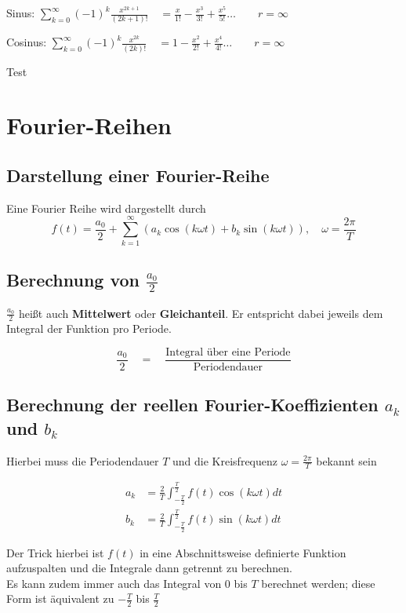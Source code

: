 \documentclass[12pt, a4paper]{scrreprt}
\begin{document}
Sinus: \hfill
\(
\sum_{k=0}^{\infty}(-1)^k\frac{x^{2k+1}}{(2k+1)!} \quad = \frac{x}{1!} - \frac{x^3}{3!} + \frac{x^5}{5!} \dots \qquad r = \infty
\)

Cosinus: \hfill
\(
\sum_{k=0}^{\infty}(-1)^k\frac{x^{2k}}{(2k)!} \quad = 1 - \frac{x^2}{2!} + \frac{x^4}{4!} \dots \qquad r = \infty
\)

Test

\clearpage

\setcounter{chapter}{15}

\chapter{Fourier-Reihen}

\section{Darstellung einer Fourier-Reihe}
Eine Fourier Reihe wird dargestellt durch
\[
  f(t) = \frac{a_0}{2} + \sum_{k=1}^{\infty}(a_k \cos (k \omega t) + b_k \sin (k \omega t)), \quad \omega = \frac{2 \pi}{T}
\]

\section{Berechnung von \(\frac{a_0}{2}\)}

\(\frac{a_0}{2}\) heißt auch \textbf{Mittelwert} oder \textbf{Gleichanteil}. Er entspricht dabei jeweils dem Integral der Funktion pro Periode.

\[
  \frac{a_0}{2} \quad = \quad \frac{\text{Integral über eine Periode}}{\text{Periodendauer}}
\]

\section{Berechnung der reellen Fourier-Koeffizienten \(a_k\) und \(b_k\)}

Hierbei muss die Periodendauer \(T\) und die Kreisfrequenz \(\omega = \frac{2\pi}{T}\) bekannt sein

\begin{align*}
  a_k &= \frac{2}{T} \int_{-\frac{T}{2}}^{\frac{T}{2}}f(t) \cos (k \omega t) dt\\[10pt]
  b_k &= \frac{2}{T} \int_{-\frac{T}{2}}^{\frac{T}{2}}f(t) \sin (k \omega t) dt
\end{align*}

Der Trick hierbei ist \(f(t)\) in eine Abschnittsweise definierte Funktion aufzuspalten und die Integrale dann getrennt zu berechnen.\\
Es kann zudem immer auch das Integral von \(0\) bis \(T\) berechnet werden; diese Form ist äquivalent zu \(-\frac{T}{2}\) bis \(\frac{T}{2}\)
\end{document}

